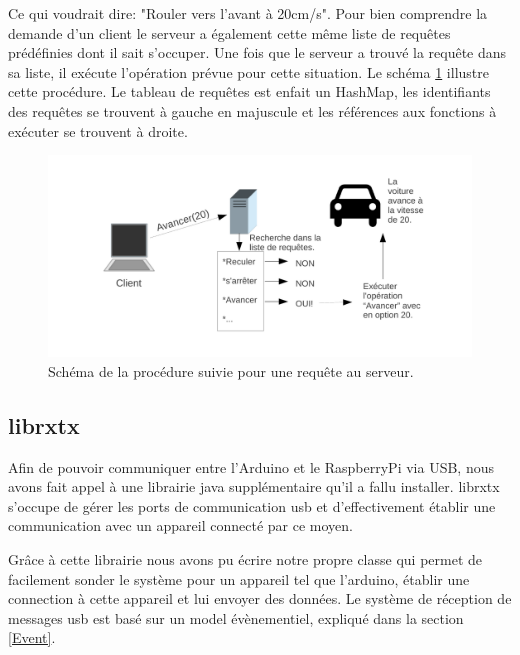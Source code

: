 \documentclass[a4paper,11pt]{report}
\begin{document}
{ 
 
 Ce qui voudrait dire: "Rouler vers l'avant à 20cm/s".  Pour bien comprendre la demande d'un client le serveur a également cette même liste de requêtes prédéfinies dont il sait s'occuper. Une fois que le serveur a trouvé la requête dans sa liste, il exécute l'opération prévue pour cette situation. Le schéma \ref{RequestHandler} illustre cette procédure.
  Le tableau de requêtes est enfait un HashMap, les identifiants des requêtes se trouvent à gauche en majuscule et les références aux fonctions à exécuter se trouvent à droite.
 
 
 
 \begin{figure}[!h]
\includegraphics[width=1.0\textwidth]{figures/RequestHandler.pdf}
\caption[Gestion de requête au serveur]{\label{RequestHandler}Schéma de la procédure suivie pour une requête au serveur.}
\end{figure}
 
\subsection{librxtx}

Afin de pouvoir communiquer entre l'Arduino et le RaspberryPi via USB, nous avons fait appel à une librairie java supplémentaire qu'il a fallu installer. librxtx s'occupe de gérer les ports de communication usb et d'effectivement établir une communication avec un appareil connecté par ce moyen.

Grâce à cette librairie nous avons pu écrire notre propre classe qui permet de facilement sonder le système pour un appareil tel que l'arduino, établir une connection à cette appareil et lui envoyer des données. Le système de réception de messages usb est basé sur un model évènementiel, expliqué dans la section \ref{Event}.

}
\end{document}

